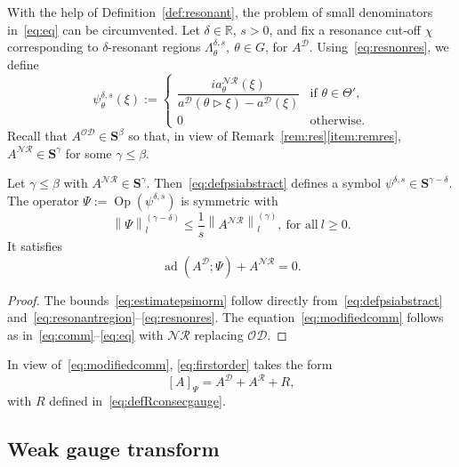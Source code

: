 \documentclass[AHL,Unicode,longabstracts,published]{cedram}
\DeclareMathOperator{\ad}{ad}
\DeclareMathOperator{\Op}{Op}
\newcommand{\R}{\mathbb R}
\newcommand{\CD}{\mathcal{D}}
\newcommand{\CN}{\mathcal{N}}
\newcommand{\CO}{\mathcal{O}}
\newcommand{\CR}{\mathcal{R}}
\newcommand{\COD}{{\CO\CD}}
\newcommand{\CNR}{{\CN\!\CR}}
\newcommand{\BS}{\mathbf S}
\newcommand{\resc}{s}
\newcommand{\rco}{\chi}
\newcommand{\act}{\triangleright}
\newcommand{\snorm}[3]{\left\| #1\right\|_{#3}^{(#2)}}
\begin{document}
With the help of Definition~\ref{def:resonant}, the problem of small denominators in~\eqref{eq:eq} can be circumvented. Let $\delta\in\R$, $s>0$, and fix a resonance cut-off $\rco$ corresponding to $\delta$-resonant regions $\Lambda_\theta^{\delta,\resc}, \ \theta\in G$, for $A^\CD$. Using~\eqref{eq:resnonres}, we define
\begin{equation}\label{eq:defpsiabstract}
\psi_\theta^{\delta,s}(\xi):=
\begin{cases}
\dfrac{ia^\CNR_\theta(\xi)}{a^\CD(\theta\act\xi)-a^\CD(\xi)}&
\text{if } \theta\in\Theta',\\[2ex] 0 & \text{otherwise}.
\end{cases}
\end{equation}
Recall that $A^{\COD}\in\BS^\beta$ so that, in view of Remark~\ref{rem:res}\eqref{item:remres}, $A^{\CNR}\in \BS^\gamma$ for some $\gamma\leq\beta$.
\begin{lemm}\label{lem:psi}
Let $\gamma\leq \beta$ with $A^{\CNR}\in \BS^\gamma$. Then~\eqref{eq:defpsiabstract} defines a symbol $\psi^{\delta,s} \in \BS^{\gamma-\delta}$. The operator $\Psi:=\Op(\psi^{\delta,s})$ is symmetric with
\begin{equation}\label{eq:estimatepsinorm}
\snorm{\Psi}{\gamma - \delta}{l} \le \frac 1 \resc \snorm{A^\CNR}{\gamma}{l}, \ \text{for all}\ l\geq 0.
\end{equation}
It satisfies
\begin{equation}\label{eq:modifiedcomm}
\ad\left(A^\CD;\Psi\right)+A^{\CNR}=0.
\end{equation}
\end{lemm}
\begin{proof}
The bounds~\eqref{eq:estimatepsinorm} follow directly from~\eqref{eq:defpsiabstract} and~\eqref{eq:resonantregion}--\eqref{eq:resnonres}. The equation~\eqref{eq:modifiedcomm} follows as in~\eqref{eq:comm}--\eqref{eq:eq} with $\CNR$ replacing $\CO\CD$.
\end{proof}


In view of~\eqref{eq:modifiedcomm}, \eqref{eq:firstorder} takes the form
\begin{equation}\label{eq:A'}
[A]_\Psi=A^\CD+A^{\CR}+R,
\end{equation}
with $R$ defined in~\eqref{eq:defRconsecgauge}.

\subsection{Weak gauge transform}\label{subsec:weakgauge}
\end{document}
